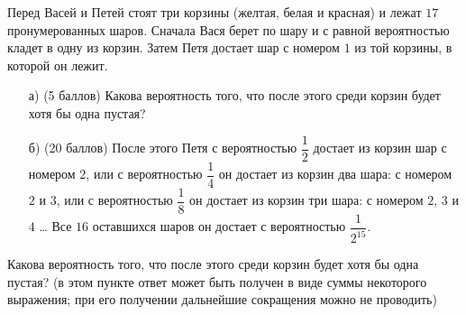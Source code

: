 
Перед Васей и Петей стоят три корзины (желтая, белая и красная) 
	и лежат $17$ пронумерованных шаров. Сначала Вася берет по шару
	и с равной вероятностью кладет в одну из корзин. 
	Затем Петя достает шар с номером $1$ из той корзины, в которой он лежит. 
	 
	\begin{enumerate}
	\item[а)] (5 баллов) Какова вероятность того, что после этого
	среди корзин будет хотя бы одна пустая?
	\item[б)] (20 баллов) После этого Петя с вероятностью $\dfrac{1}{2}$
	достает из корзин шар с номером $2$, или с вероятностью $\dfrac{1}{4}$
	он достает из корзин два шара: с номером $2$ и $3$, или с вероятностью
	$\dfrac{1}{8}$ он достает из корзин три шара: с номером $2$, $3$ и $4$ \dots
	Все $16$ оставшихся шаров он достает с вероятностью $\dfrac{1}{2^{15}}$.
	\end{enumerate}
	 Какова вероятность того, что после этого
	среди корзин будет хотя бы одна пустая?
	(в этом пункте ответ может быть получен в виде суммы 
	некоторого выражения; при его получении дальнейшие 
	сокращения можно не проводить)